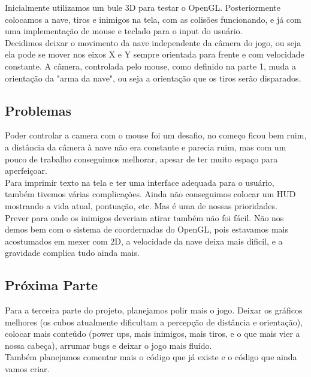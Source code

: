 \documentclass[12pt,a4paper]{article}
\begin{document}
    		Inicialmente utilizamos um bule 3D para testar o OpenGL. Posteriormente colocamos a nave, tiros e inimigos
		na tela, com as colisões funcionando, e já com uma implementação de mouse e teclado para o input do usuário.\\
    		
    		Decidimos deixar o movimento da nave independente da câmera do jogo, ou seja ela pode se mover
		nos eixos X e Y sempre orientada para frente e com velocidade constante. A câmera, controlada pelo mouse,
		como definido na parte 1, muda a orientação da "arma da nave", ou seja a orientação que os tiros serão 				disparados.\\
		
		\subsection{Problemas}
		Poder controlar a camera com o mouse foi um desafio, no começo ficou bem ruim, a distância da câmera à nave
		não era constante e parecia ruim, mas com um pouco de trabalho conseguimos melhorar, apesar de ter muito 				espaço para aperfeiçoar. \\
    		
    		Para imprimir texto na tela e ter uma interface adequada para o usuário, também tivemos várias complicações.
    		Ainda não conseguimos colocar um HUD mostrando a vida atual, pontuação, etc. Mas é uma de nossas prioridades.\\
    		
    		Prever para onde os inimigos deveriam atirar também não foi fácil. Não nos demos bem com o sistema de 				coordernadas do OpenGL, pois estavamos mais acostumados em mexer com 2D, a velocidade da nave deixa mais 				dificil, e a gravidade complica tudo ainda mais.
		
		
		\subsection{Próxima Parte}
		Para a terceira parte do projeto, planejamos polir mais o jogo. Deixar os gráficos melhores (os cubos
		atualmente dificultam a percepção de distância e orientação), colocar mais conteúdo (power ups, mais 					inimigos, mais tiros, e o que mais vier a nossa cabeça), arrumar bugs e deixar o jogo mais fluído.\\
		
		Também planejamos comentar mais o código que já existe e o código que ainda vamos criar.
		
\end{document}
